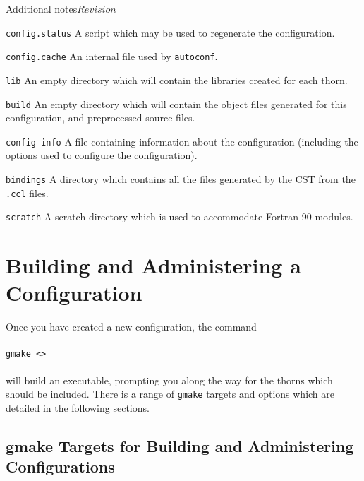 \begin{cactuspart}{Additional notes}{}{$Revision$}
\begin{Lentry}
\begin{Lentry}
\item [\texttt{config.status}]
A script which may be used to regenerate the configuration.

\item [\texttt{config.cache}]
An internal file used by \texttt{autoconf}.

\end{Lentry}

\item [\texttt{lib}]
An empty directory which will contain the libraries created for each thorn.

\item [\texttt{build}]
An empty directory which will contain the object files generated for this
configuration, and preprocessed source files.

\item [\texttt{config-info}]
A file containing information about the configuration (including the options used to configure the configuration).

\item [\texttt{bindings}] A directory which contains all the files
generated by the CST from the \texttt{.ccl} files.

\item [\texttt{scratch}]
A scratch directory which is used to accommodate Fortran 90 modules.

\end{Lentry}


\section{Building and Administering a Configuration}
\label{sec:buanadaco}

Once you have created a new configuration, the command
\\ \\
\texttt{gmake <>}
\\ \\
will build an executable, prompting you along the way for the
thorns which should be included. There is a range of \texttt{gmake}
targets and options which are detailed in the following sections.

\subsection{gmake Targets for Building and Administering Configurations}
\label{sec:gmtafobuanadco}


\end{cactuspart}
